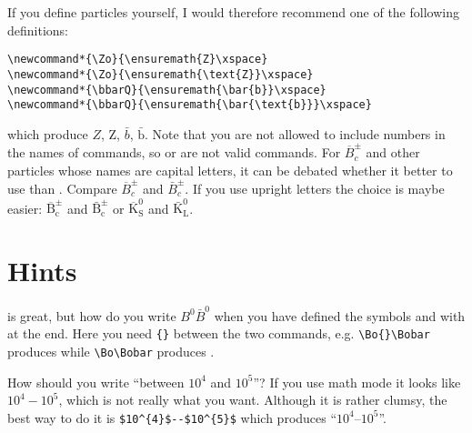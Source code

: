 If you define particles yourself,
I would therefore recommend one of the following definitions:
\begin{verbatim}
\newcommand*{\Zo}{\ensuremath{Z}\xspace}
\newcommand*{\Zo}{\ensuremath{\text{Z}}\xspace}
\newcommand*{\bbarQ}{\ensuremath{\bar{b}}\xspace}
\newcommand*{\bbarQ}{\ensuremath{\bar{\text{b}}}\xspace}
\end{verbatim}
which produce \ensuremath{Z}, \ensuremath{\text{Z}},
\ensuremath{\bar{b}}, \ensuremath{\bar{\text{b}}}. Note that you are
not allowed to include numbers in the names of commands, so
 or  are not valid commands. For
$\overline{B}^{\pm}_{c}$ and other particles whose names are capital
letters, it can be debated whether it better to use
 than
. Compare $\overline{B}^{\pm}_{c}$ and
$\bar{B}^{\pm}_{c}$. If you use upright letters the choice is maybe
easier: $\overline{\text{B}}^{\pm}_{\text{c}}$ and
$\bar{\text{B}}^{\pm}_{\text{c}}$ or
$\overline{\text{K}}^{0}_{\text{S}}$ and
$\bar{\text{K}}^{0}_{\text{L}}$.


\section{Hints}
\label{sec:tips:hints}

 is great, but how do you write $B^{0}\bar{B}^{0}$ when
you have defined the symbols  and  with
 at the end. Here you need \verb+{}+ between the two
commands, e.g. \verb+\Bo{}\Bobar+ produces \Bo{}\Bobar while
\verb+\Bo\Bobar+ produces \Bo\Bobar.

How should you write \enquote{between $10^{4}$ and $10^{5}$}?
If you use math mode it looks like $10^{4} - 10^{5}$, which is not
really what you want. Although it is rather clumsy, the best way to do
it is \verb+$10^{4}$--$10^{5}$+ which produces
\enquote{$10^{4}$--$10^{5}$}.

